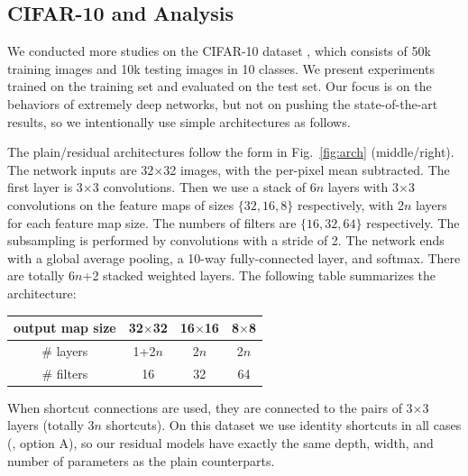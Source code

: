 \documentclass[10pt,twocolumn,letterpaper]{article}
\renewcommand\arraystretch{1.2}
\begin{document}
\subsection{CIFAR-10 and Analysis}

We conducted more studies on the CIFAR-10 dataset \cite{Krizhevsky2009}, which consists of 50k training images and 10k testing images in 10 classes. We present experiments trained on the training set and evaluated on the test set.
Our focus is on the behaviors of extremely deep networks, but not on pushing the state-of-the-art results, so we intentionally use simple architectures as follows.

The plain/residual architectures follow the form in Fig.~\ref{fig:arch} (middle/right).
The network inputs are 32$\times$32 images, with the per-pixel mean subtracted. The first layer is 3$\times$3 convolutions. Then we use a stack of $6n$ layers with 3$\times$3 convolutions on the feature maps of sizes $\{32, 16, 8\}$ respectively, with 2$n$ layers for each feature map size. The numbers of filters are $\{16, 32, 64\}$ respectively. The subsampling is performed by convolutions with a stride of 2. The network ends with a global average pooling, a 10-way fully-connected layer, and softmax. There are totally 6$n$+2 stacked weighted layers. The following table summarizes the architecture:
\renewcommand\arraystretch{1.1}
\begin{center}
  \small
  \setlength{\tabcolsep}{8pt}
  \begin{tabular}{c|c|c|c}
    \hline
    output map size & 32$\times$32 & 16$\times$16 & 8$\times$8 \\
    \hline
    \# layers       & 1+2$n$       & 2$n$         & 2$n$       \\
    \# filters      & 16           & 32           & 64         \\
    \hline
  \end{tabular}
\end{center}
When shortcut connections are used, they are connected to the pairs of 3$\times$3 layers (totally $3n$ shortcuts). On this dataset we use identity shortcuts in all cases (\ie, option A), so our residual models have exactly the same depth, width, and number of parameters as the plain counterparts.
\end{document}
